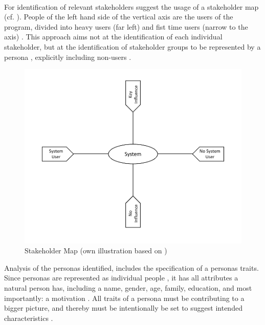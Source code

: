 \paragraph{} For identification of relevant stakeholders \textcite[38]{Robier.2016} suggest the usage of a stakeholder map (cf. ). People of the left hand side of the vertical axis are the users of the program, divided into heavy users (far left) and fist time users (narrow to the axis) \parencite[cf.][38]{Robier.2016}. This approach aims not at the identification of each individual stakeholder, but at the identification of stakeholder groups to be represented by a persona \parencite[cf.][82]{Cooper.2007}, explicitly  including non-users \parencite[cf.][84]{Cooper.2007}.
\begin{figure}[H]
\centering
    \includegraphics[scale=0.7]{img/stakeholderMap.pdf}
    \caption[Stakeholder Map]{Stakeholder Map (own illustration based on \cite[38]{Robier.2016})}
    \label{fig:stakeMap}
\end{figure}
Analysis of the personas identified, includes the specification of a personas traits. Since personas are represented as individual people \parencite[cf.][81]{Cooper.2007}, it has all attributes a natural person has, including a name, gender, age, family, education, and most importantly: a motivation \parencites[cf.][]{Platt.2016}[cf.][83-84]{Cooper.2007}. All traits of a persona must be contributing to a bigger picture, and thereby must be intentionally be set to suggest intended characteristics \parencite[cf.]{Platt.2016}. 
